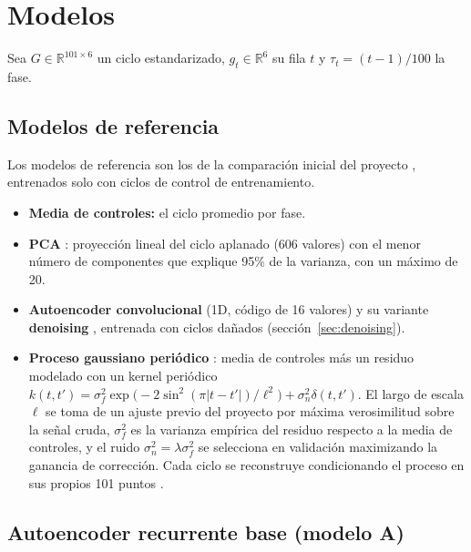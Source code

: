 \documentclass[11pt,a4paper]{article}
\newcommand{\R}{\mathbb{R}}
\begin{document}
\section{Modelos}

Sea $G\in\R^{101\times 6}$ un ciclo estandarizado, $g_t\in\R^6$ su fila $t$ y $\tau_t=(t-1)/100$ la fase.

\subsection{Modelos de referencia}

Los modelos de referencia son los de la comparación inicial del proyecto \cite{neurostride2026}, entrenados solo con ciclos de control de entrenamiento.
\begin{itemize}
\item \textbf{Media de controles:} el ciclo promedio por fase.
\item \textbf{PCA} \cite{jolliffe2016}: proyección lineal del ciclo aplanado (606 valores) con el menor número de componentes que explique 95\% de la varianza, con un máximo de 20.
\item \textbf{Autoencoder convolucional} (1D, código de 16 valores) \cite{hinton2006} y su variante \textbf{denoising} \cite{vincent2008}, entrenada con ciclos dañados (sección~\ref{sec:denoising}).
\item \textbf{Proceso gaussiano periódico} \cite{rasmussen2006}: media de controles más un residuo modelado con un kernel periódico $k(t,t')=\sigma_f^2\exp\!\big(-2\sin^2(\pi|t-t'|)/\ell^2\big)+\sigma_n^2\delta(t,t')$. El largo de escala $\ell$ se toma de un ajuste previo del proyecto por máxima verosimilitud sobre la señal cruda, $\sigma_f^2$ es la varianza empírica del residuo respecto a la media de controles, y el ruido $\sigma_n^2=\lambda\sigma_f^2$ se selecciona en validación maximizando la ganancia de corrección. Cada ciclo se reconstruye condicionando el proceso en sus propios 101 puntos \cite{neurostride2026}.
\end{itemize}

\subsection{Autoencoder recurrente base (modelo A)}
\end{document}
